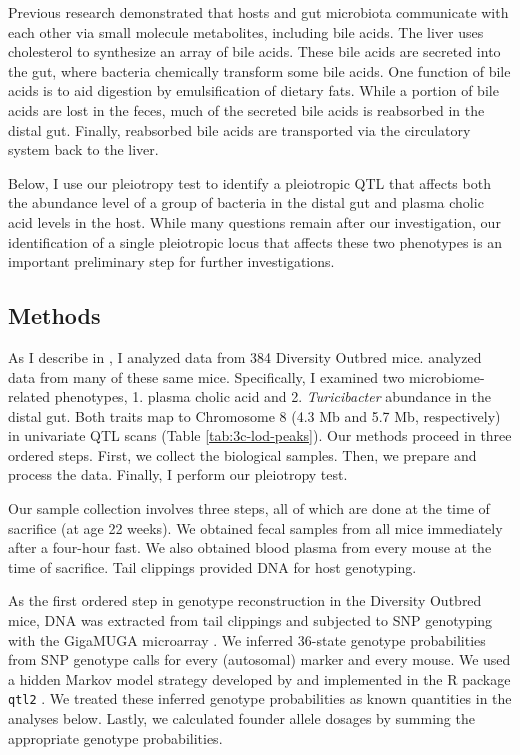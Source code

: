 \documentclass[oneside]{book}\usepackage[]{graphicx}\usepackage[]{color}
\begin{document}
Previous research demonstrated that hosts and gut microbiota communicate 
with each other via small molecule metabolites, including bile acids. 
The liver uses cholesterol to synthesize an array of bile acids. 
These bile acids are secreted into the gut, where bacteria chemically transform some bile acids. 
One function of bile acids is to aid digestion by emulsification of dietary fats. 
While a portion of bile acids are lost in the feces, much of the secreted bile acids is reabsorbed in the distal gut. 
Finally, reabsorbed bile acids are transported via the circulatory system back to the liver.


Below, I use our pleiotropy test to identify a pleiotropic QTL that affects both the 
abundance level of a group of bacteria in the distal gut and plasma cholic acid levels in the host. 
While many questions remain after our investigation, 
our identification of a single pleiotropic locus that affects these two phenotypes 
is an important preliminary step for further investigations.



\subsection{Methods}

As I describe in \citet{kemis2019genetic}, I analyzed data from 384 Diversity Outbred mice.
\citet{keller2018genetic} analyzed data from many of these same mice. 
Specifically, I examined two microbiome-related phenotypes, 1. plasma cholic acid and 
2. \emph{Turicibacter} abundance in the distal gut. 
Both traits map to Chromosome 8 (4.3 Mb and 5.7 Mb, respectively) in 
univariate QTL scans (Table \ref{tab:3c-lod-peaks}).
Our methods proceed in three ordered steps. 
First, we collect the biological samples. 
Then, we prepare and process the data. 
Finally, I perform our pleiotropy test.

Our sample collection involves three steps, all of which are done at the time of sacrifice (at age 22 weeks). 
We obtained fecal samples from all mice immediately 
after a four-hour fast. 
We also obtained blood plasma from every mouse at the time of sacrifice. 
Tail clippings provided DNA for host genotyping.


As the first ordered step in genotype reconstruction in the Diversity Outbred mice, DNA was extracted from tail clippings and subjected to SNP genotyping with the GigaMUGA microarray \citep{morgan2015mouse}. 
We inferred 36-state genotype probabilities from SNP genotype calls for every (autosomal) 
marker and every mouse. 
We used a hidden Markov model strategy developed by 
\citet{broman2012genotype, broman2012haplotype} and implemented in 
the R package \texttt{qtl2} \citep{broman2019rqtl2}. 
We treated these inferred 
genotype probabilities as known quantities in the analyses below. 
Lastly, we calculated founder allele dosages by summing the appropriate 
genotype probabilities. 
\end{document}
